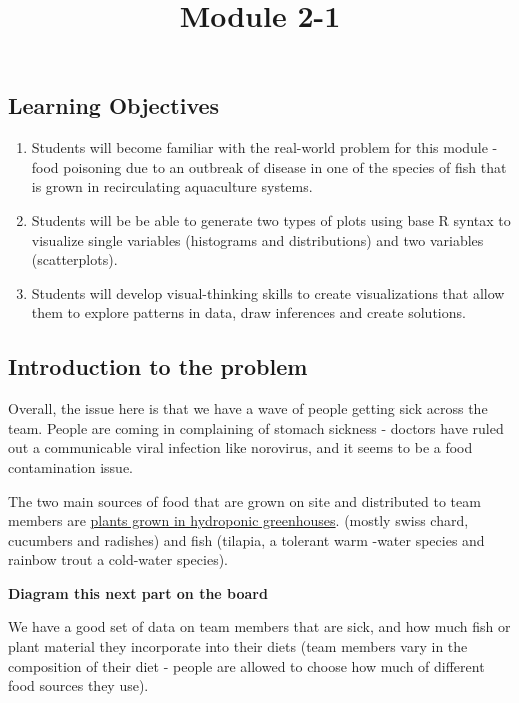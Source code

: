 \documentclass[
]{article}
\title{Module 2-1}
\author{}
\date{\vspace{-2.5em}}
\providecommand{\tightlist}{%
  \setlength{\itemsep}{0pt}\setlength{\parskip}{0pt}}
\begin{document}
\maketitle

\hypertarget{learning-objectives}{%
\subsection{Learning Objectives}\label{learning-objectives}}

\begin{enumerate}
\def\labelenumi{\arabic{enumi}.}
\tightlist
\item
  Students will become familiar with the real-world problem for this
  module - food poisoning due to an outbreak of disease in one of the
  species of fish that is grown in recirculating aquaculture systems.\\
\item
  Students will be be able to generate two types of plots using base R
  syntax to visualize single variables (histograms and distributions)
  and two variables (scatterplots).
\item
  Students will develop visual-thinking skills to create visualizations
  that allow them to explore patterns in data, draw inferences and
  create solutions.
\end{enumerate}

\hypertarget{introduction-to-the-problem}{%
\subsection{Introduction to the
problem}\label{introduction-to-the-problem}}

Overall, the issue here is that we have a wave of people getting sick
across the team. People are coming in complaining of stomach sickness -
doctors have ruled out a communicable viral infection like norovirus,
and it seems to be a food contamination issue.

The two main sources of food that are grown on site and distributed to
team members are
\href{https://thespoon.tech/scientists-in-antarctica-grow-food-without-soil-or-sunlight-get-ready-mars/}{plants
grown in hydroponic greenhouses}. (mostly swiss chard, cucumbers and
radishes) and fish (tilapia, a tolerant warm -water species and rainbow
trout a cold-water species).

\textbf{Diagram this next part on the board}

We have a good set of data on team members that are sick, and how much
fish or plant material they incorporate into their diets (team members
vary in the composition of their diet - people are allowed to choose how
much of different food sources they use).
\end{document}
